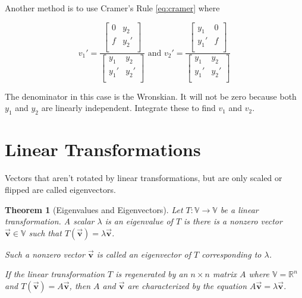 \documentclass[12pt, landscape, twocolumn]{article}
\let\oldvec\vec
\renewcommand{\vec}[1]{\oldvec{\mathbf{ #1 } } }                    %
\newtheorem{thm}{Theorem}
\begin{document}
    Another method is to use Cramer's Rule \eqref{eq:cramer} where

        \[
            v_1\prime = \frac{\left[ \begin{matrix}
                0 & y_2\\
                f & y_2\prime\\
            \end{matrix} \right]}{\left[ \begin{matrix}
                y_1 & y_2\\
                y_1\prime & y_2\prime\\
            \end{matrix} \right]}
            \text{ and }
            v_2\prime = \frac{\left[ \begin{matrix}
                y_1 & 0\\
                y_1\prime & f\\
            \end{matrix} \right]}{\left[ \begin{matrix}
                y_1 & y_2\\
                y_1\prime & y_2\prime\\
            \end{matrix} \right]}
        \]

    The denominator in this case is the Wronskian. It will not be zero because both $y_1$ and $y_2$ are linearly independent. Integrate these to find $v_1$ and $v_2$.

\section{Linear Transformations}
Vectors that aren't rotated by linear transformations, but are only scaled or flipped are called eigenvectors.

\begin{thm}[Eigenvalues and Eigenvectors]
    Let $T: \mathbb{V} \to \mathbb{V}$ be a linear transformation. A scalar $\lambda$ is an eigenvalue of $T$ is there is a nonzero vector $\vec{v} \in \mathbb{V}$ such that $T(\vec{v}) = \lambda \vec{v}$.

    Such a nonzero vector $\vec{v}$ is called an eigenvector of $T$ corresponding to $\lambda$.

    If the linear transformation $T$ is regenerated by an $n\times n$ matrix $A$ where $\mathbb{V} = \mathbb{R}^n$ and $T(\vec{v}) = A \vec{v}$, then $A$ and $\vec{v}$ are characterized by the equation $A \vec{v} = \lambda \vec{v}$.
\end{thm}
\end{document}
